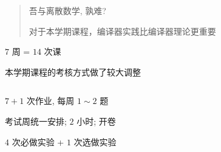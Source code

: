 
\begin{frame}{}
  \begin{columns}
  \end{columns}

  \vspace{0.50cm}
  \begin{quote}
    \centering
    {\large 吾与离散数学, 孰难?}

    \pause
    \vspace{0.50cm}
    对于本学期课程，编译器实践比编译器理论更重要
  \end{quote}
\end{frame}

\begin{frame}{}
  \begin{center}
    {\large $7$ 周 = $14$ 次课 \red{$<$} }


    \vspace{0.30cm}
    {\large 本学期课程的考核方式做了较大调整}
  \end{center}
\end{frame}

\begin{frame}{}
  \begin{columns}
      \begin{description}
        \setlength{\itemsep}{25pt}
        \item[{\bf 平时作业 ($15$ 分):}] $7 + 1$ 次作业, 每周 $1 \sim 2$ 题
        \item[{\bf 期末测试 ($40$ 分):}] 考试周统一安排; $2$ 小时; 开卷
        \item[{\bf 课程实验 ($45$ 分):}] $4$ 次必做实验 + $1$ 次选做实验 
      \end{description}
  \end{columns}

  \pause
  \vspace{1.00cm}
  \begin{center}
  \end{center}
\end{frame}

